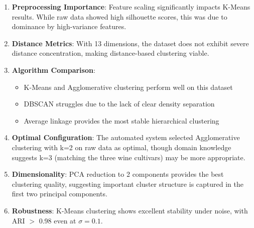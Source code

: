 \documentclass[12pt,a4paper]{article}
\begin{document}
\begin{enumerate}
    \item \textbf{Preprocessing Importance}: Feature scaling significantly impacts K-Means results. While raw data showed high silhouette scores, this was due to dominance by high-variance features.
    
    \item \textbf{Distance Metrics}: With 13 dimensions, the dataset does not exhibit severe distance concentration, making distance-based clustering viable.
    
    \item \textbf{Algorithm Comparison}: 
    \begin{itemize}
        \item K-Means and Agglomerative clustering perform well on this dataset
        \item DBSCAN struggles due to the lack of clear density separation
        \item Average linkage provides the most stable hierarchical clustering
    \end{itemize}
    
    \item \textbf{Optimal Configuration}: The automated system selected Agglomerative clustering with k=2 on raw data as optimal, though domain knowledge suggests k=3 (matching the three wine cultivars) may be more appropriate.
    
    \item \textbf{Dimensionality}: PCA reduction to 2 components provides the best clustering quality, suggesting important cluster structure is captured in the first two principal components.
    
    \item \textbf{Robustness}: K-Means clustering shows excellent stability under noise, with ARI $>$ 0.98 even at $\sigma = 0.1$.
\end{enumerate}
\end{document}
